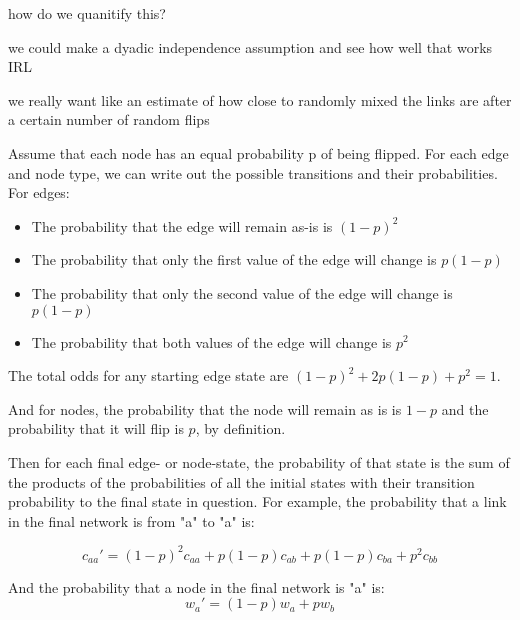 \documentclass[a4paper]{article}
\begin{document}
how do we quanitify this?

we could make a dyadic independence assumption and see how well that works IRL

we really want like an estimate of how close to randomly mixed the links are after a certain number of random flips

Assume that each node has an equal probability p of being flipped. For each edge and node type, we can write out the possible transitions and their probabilities. For edges:

\begin{itemize}
\item The probability that the edge will remain as-is is $(1-p)^2$
\item The probability that only the first value of the edge will change is $p(1-p)$
\item The probability that only the second value of the edge will change is $p(1-p)$
\item The probability that both values of the edge will change is $p^2$
\end{itemize}

The total odds for any starting edge state are $(1-p)^2 + 2p(1-p) + p^2 = 1$.

And for nodes, the probability that the node will remain as is is $1-p$ and the probability that it will flip is $p$, by definition.

Then for each final edge- or node-state, the probability of that state is the sum of the products of the probabilities of all the initial states with their transition probability to the final state in question. For example, the probability that a link in the final network is from "a" to "a" is:

\begin{equation*}
c_{aa}' = (1-p)^2c_{aa} + p(1-p)c_{ab} + p(1-p)c_{ba} + p^2c_{bb}
\end{equation*}

And the probability that a node in the final network is "a" is:
\begin{equation*}
w_a' = (1-p)w_a + pw_b
\end{equation*}
\end{document}
